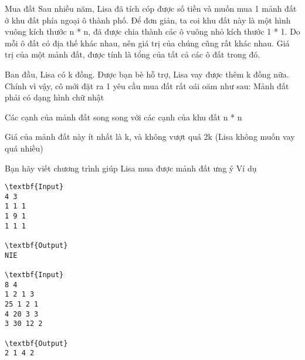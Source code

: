 Mua đất
Sau nhiều năm, Lisa đã tích cóp được số tiền và muốn mua 1 mảnh đất ở khu đất phía ngoại ô thành phố. Để đơn giản, ta coi khu đất này là một hình vuông kích thước n * n, đã được chia thành các ô vuông nhỏ kích thước 1 * 1. Do mỗi ô đất có địa thế khác nhau, nên giá trị của chúng cũng rất khác nhau. Giá trị của một mảnh đất, được tính là tổng của tất cả các ô đất trong đó.  

   Ban đầu, Lisa có k đồng. Được bạn bè hỗ trợ, Lisa vay được thêm k đồng nữa. Chính vì vậy, cô mới đặt ra 1 yêu cầu mua đất rất oái oăm như sau: Mảnh đất phải có dạng hình chữ nhật  

   Các cạnh của mảnh đất song song với các cạnh của khu đất n * n  

   Giá của mảnh đất này ít nhất là k, và không vượt quá 2k (Lisa không muốn vay quá nhiều)  

   Bạn hãy viết chương trình giúp Lisa mua được mảnh đất ưng ý
Ví dụ
\begin{verbatim}
\textbf{Input}
4 3
1 1 1
1 9 1
1 1 1

\textbf{Output}
NIE

\textbf{Input}
8 4
1 2 1 3
25 1 2 1
4 20 3 3
3 30 12 2

\textbf{Output}
2 1 4 2
\end{verbatim}